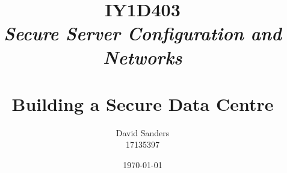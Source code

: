 \documentclass[12pt]{article}
\title
{
  IY1D403
  \\
  {
    \textit
    {
      \small Secure Server Configuration and Networks
    }
  }
  \\~\\
  Building a Secure Data Centre
}
\author{David Sanders\\{\LARGE 17135397}}
\date{\today}
\begin{document}
\maketitle
\pagebreak
\tableofcontents







\pagebreak
\begin{flushleft}
  
\end{flushleft}
\end{document}
